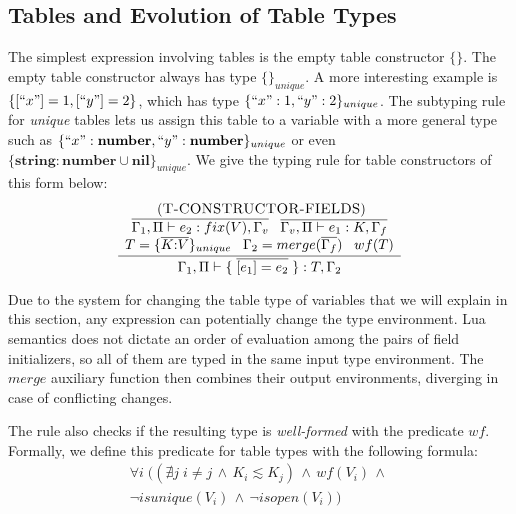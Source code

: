 \documentclass[preprint]{sigplanconf}
\newcommand{\Nil}{\mathbf{nil}}
\newcommand{\Number}{\mathbf{number}}
\newcommand{\String}{\mathbf{string}}
\newcommand{\mylabel}[1]{\; (\textsc{#1})}
\newcommand{\env}{\Gamma}
\newcommand{\penv}{\Pi}
\begin{document}
\subsection{Tables and Evolution of Table Types}
\label{sec:tables}

The simplest expression involving tables is the empty
table constructor $\{\}$. The empty table constructor always
has type $\{\}_{unique}$. A more interesting example is $\{ [``x"] = 1, [``y"] = 2 \}$, which has type $\{ ``x":1 , ``y": 2 \}_{unique}$. The subtyping rule for {\em unique} tables lets
us assign this table to a variable with a more general
type such as $\{ ``x":\Number , ``y": \Number \}_{unique}$ or
even $\{ \String:\Number \cup \Nil \}_{unique}$. We give
the typing rule for table constructors of this form below: 
\[
\begin{array}{c}
\mylabel{T-CONSTRUCTOR-FIELDS}\\
\dfrac{\begin{array}{c}
	\overline{\env_1, \penv \vdash e_2: fix(V), \env_v}
	\;\;\;
	\overline{\env_v, \penv \vdash e_1: K, \env_f}
	\\
	T = \{\overline{K{:}V}\}_{unique} \;\;\;
	\env_{2} = merge(\overline{\env_{f}}) \;\;\; wf(T)
	\end{array}}
{\env_{1}, \penv \vdash \{\;\overline{[e_{1}] = e_{2}}\;\}:T, \env_{2}}
\end{array}
\]

Due to the system for changing the table type of variables that
we will explain in this section, any expression can potentially
change the type environment. Lua semantics does not dictate
an order of evaluation among the pairs of field initializers,
so all of them are typed in the same input type environment.
The $merge$ auxiliary function then combines their output
environments, diverging in case of conflicting changes.

The rule also checks if the resulting type is {\em well-formed}
with the predicate $wf$. Formally, we define this predicate
for table types with the following formula:
\[
\begin{array}{c}
\forall i \; ((\nexists j \; i \not= j \,\wedge\, K_{i} \lesssim K_{j}) \,\wedge\, wf(V_{i}) \,\wedge\,\\ \lnot isunique(V_{i}) \,\wedge\, \lnot isopen(V_{i}))
\end{array}
\]
\end{document}
